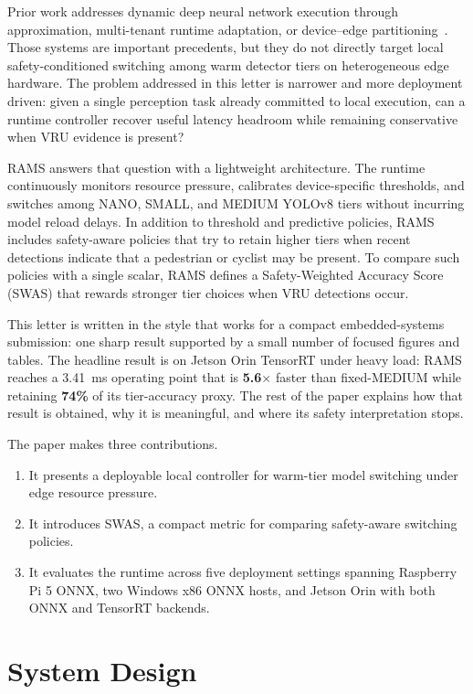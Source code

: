 \documentclass[10pt,journal]{IEEEtran}
\newcommand{\rams}{RAMS}
\newcommand{\swas}{SWAS}
\begin{document}
Prior work addresses dynamic deep neural network execution through approximation, multi-tenant runtime adaptation, or device--edge partitioning~\cite{han2016mcdnn,fang2018nestdnn,kang2017neurosurgeon,li2018edgent}. Those systems are important precedents, but they do not directly target local safety-conditioned switching among warm detector tiers on heterogeneous edge hardware. The problem addressed in this letter is narrower and more deployment driven: given a single perception task already committed to local execution, can a runtime controller recover useful latency headroom while remaining conservative when VRU evidence is present?

\rams{} answers that question with a lightweight architecture. The runtime continuously monitors resource pressure, calibrates device-specific thresholds, and switches among NANO, SMALL, and MEDIUM YOLOv8 tiers without incurring model reload delays. In addition to threshold and predictive policies, \rams{} includes safety-aware policies that try to retain higher tiers when recent detections indicate that a pedestrian or cyclist may be present. To compare such policies with a single scalar, \rams{} defines a Safety-Weighted Accuracy Score (\swas{}) that rewards stronger tier choices when VRU detections occur.

This letter is written in the style that works for a compact embedded-systems submission: one sharp result supported by a small number of focused figures and tables. The headline result is on Jetson Orin TensorRT under heavy load: \rams{} reaches a \SI{3.41}{ms} operating point that is \textbf{5.6$\times$} faster than fixed-MEDIUM while retaining \textbf{74\%} of its tier-accuracy proxy. The rest of the paper explains how that result is obtained, why it is meaningful, and where its safety interpretation stops.

The paper makes three contributions.
\begin{enumerate}
\item It presents a deployable local controller for warm-tier model switching under edge resource pressure.
\item It introduces \swas{}, a compact metric for comparing safety-aware switching policies.
\item It evaluates the runtime across five deployment settings spanning Raspberry Pi 5 ONNX, two Windows x86 ONNX hosts, and Jetson Orin with both ONNX and TensorRT backends.
\end{enumerate}

\section{System Design}
\end{document}
